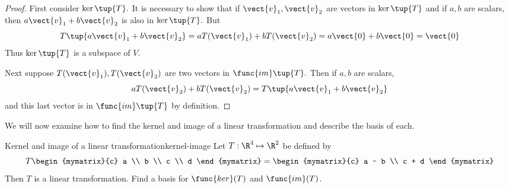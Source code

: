 \begin{proof}
First consider $\ker \tup{T} .$ It is necessary to
show that if $\vect{v}_{1},\vect{v}_{2}$ are vectors in $\ker \tup{T} $
and if $a,b$ are scalars, then $a\vect{v}_{1}+b\vect{v}_{2}$ is also in $\ker
\tup{T} .$ But 
\begin{equation*}
T\tup{a\vect{v}_{1}+b\vect{v}_{2}} =aT(\vect{v}_{1})+bT(\vect{v}_{2})=a\vect{0}+b\vect{0}=\vect{0}
\end{equation*}
Thus $\ker \tup{T} $ is a subspace of $V$.

Next suppose $T(\vect{v}_{1}),T(\vect{v}_{2})$ are two vectors in $\func{im}\tup{
T} .$ Then if $a,b$ are scalars, 
\begin{equation*}
aT(\vect{v}_{2})+bT(\vect{v}_{2})=T\tup{a\vect{v}_{1}+b\vect{v}_{2}}
\end{equation*}
and this last vector is in $\func{im}\tup{T} $ by definition. 
\end{proof}

We will now examine how to find the kernel and image of a linear transformation and describe the basis of each. 

\begin{example}{Kernel and image of a linear transformation}{kernel-image}
Let $T: \R^4 \mapsto \R^2$ be defined by
\[
T \begin{mymatrix}{c}
a \\
b \\
c \\
d
\end{mymatrix} = 
\begin{mymatrix}{c}
a - b \\ 
c + d
\end{mymatrix}
\]
Then $T$ is a linear transformation. Find a basis for $\func{ker}(T)$ and $\func{im}(T)$. 
\end{example}

